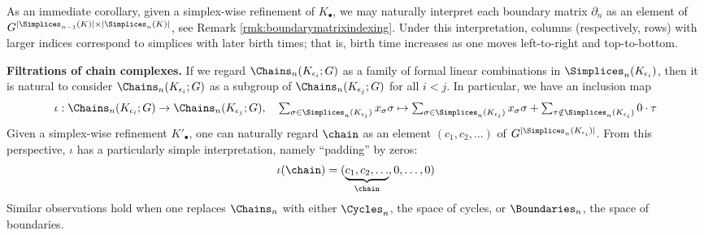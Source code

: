 
As an immediate corollary, given a simplex-wise refinement of $K_\bullet$, we may naturally interpret each boundary matrix $\partial_n$ as an element of $G^{|\Simplices_{n-1}(K)| \times |\Simplices_{n}(K)|}$, see Remark \ref{rmk:boundarymatrixindexing}.  Under this interpretation, columns (respectively, rows) with larger indices correspond to simplices with later birth times; that is, birth time increases as one moves left-to-right and top-to-bottom.  



\noindent \textbf{Filtrations of chain complexes.} If we regard $\Chains_n(K_{\epsilon_i}; G)$ as a family of formal linear combinations in $\Simplices_n(K_{\epsilon_i})$, then it is natural to consider $\Chains_n(K_{\epsilon_i}; G)$ as a subgroup of $\Chains_n(K_{\epsilon_{j}}; G)$ for all $i<j$.  In particular, we have an inclusion map     \begin{align*}
    \textstyle
    \iota: \Chains_n(K_{\epsilon_i}; G) \to \Chains_n(K_{\epsilon_j}; G),
    \quad
    \sum_{\sigma \in \Simplices_n(K_{\epsilon_i})} x_\sigma \sigma
    \mapsto
    \sum_{\sigma \in \Simplices_n(K_{\epsilon_i})} x_\sigma \sigma
    +
    \sum_{\tau \notin \Simplices_n(K_{\epsilon_i})}
    0 \cdot \tau
    \end{align*}
Given a simplex-wise refinement $K'_\bullet$, one can naturally regard $\chain$ as an element  $(c_1, c_2,  \ldots)$ of $ G^{|\Simplices_n(K_{\epsilon_i})|}$.  From this perspective, $\iota$ has a particularly simple interpretation, namely  ``padding'' by zeros:
    \begin{align*}
        \iota(\chain) = ( \underbrace{c_1, c_2, \ldots}_{\chain}, 0, \ldots, 0)
    \end{align*}
Similar observations hold when one replaces $\Chains_n$ with either $\Cycles_n$, the space of cycles, or $\Boundaries_n$, the space of boundaries.



